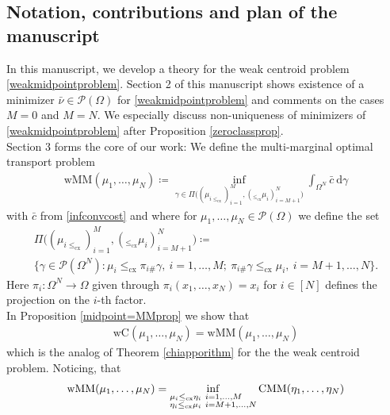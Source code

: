 \documentclass[letterpaper]{amsart}
\newcommand{\dd}{\mathrm{d}}
\theoremstyle{definition}
\begin{document}
\subsection{Notation, contributions and plan of the manuscript}
In this manuscript, we develop a theory for the weak centroid problem \eqref{weakmidpointproblem}. Section 2 of this manuscript shows existence of a minimizer $\bar\nu\in\mathcal P(\Omega)$ for \eqref{weakmidpointproblem} and comments on the cases $M=0$ and $M=N$. We especially discuss non-uniqueness of minimizers of \eqref{weakmidpointproblem} after Proposition \ref{zeroclassprop}.\\
Section 3 forms the core of our work: We define the multi-marginal optimal transport problem 
\begin{gather}\label{weakMM}
	\text{wMM}(\mu_1,\dots,\mu_N)\coloneqq\inf_{\gamma\in\Pi\big((\mu_{i\leq_{\text{cx}}})_{i=1}^M,(_{\leq_{\text{cx}}}\mu_i)_{i=M+1}^N\big)}\int_{\Omega^N}\bar c\ \dd\gamma
\end{gather}
with $\bar c$ from \eqref{infconvcost} and where for $\mu_1,\dots,\mu_N\in\mathcal P(\Omega)$ we define the set
\begin{equation}\label{Pmargset}
	\begin{gathered}
		\Pi\big((\mu_{i\leq_{\text{cx}}})_{i=1}^M,(_{\leq_{\text{cx}}}\mu_i)_{i=M+1}^N\big)\coloneqq\\
		\Big\{\gamma\in\mathcal P(\Omega^N):\mu_i\leq_{\text{cx}}\pi_{i\#}\gamma,\ i=1,\dots,M;\ \pi_{i\#}\gamma\leq_{\text{cx}}\mu_i,\ i=M+1,\dots,N\Big\}.
	\end{gathered}
\end{equation}
Here $\pi_i:\Omega^N\rightarrow\Omega$ given through $\pi_i(x_1,\dots,x_N)=x_i$ for $i\in[N]$ defines the projection on the $i$-th factor.\\
In Proposition \ref{midpoint=MMprop} we show that
\begin{gather*}
	\text{wC}(\mu_1,\dots,\mu_N)=\text{wMM}(\mu_1,\dots,\mu_N)
\end{gather*}
which is the analog of Theorem \ref{chiapporithm} for the the weak centroid problem.
Noticing, that 
\begin{gather*}
	\text{wMM}(\mu_1,\dots,\mu_N)=\inf_{\begin{subarray}{l}\mu_i\leq_{\text{cx}}\eta_i\ i=1,\dots,M\\
			\eta_i\leq_{\text{cx}}\mu_i\ i=M+1,\dots,N	\end{subarray}}\text{CMM}(\eta_1,\dots,\eta_N)
\end{gather*}
\end{document}
